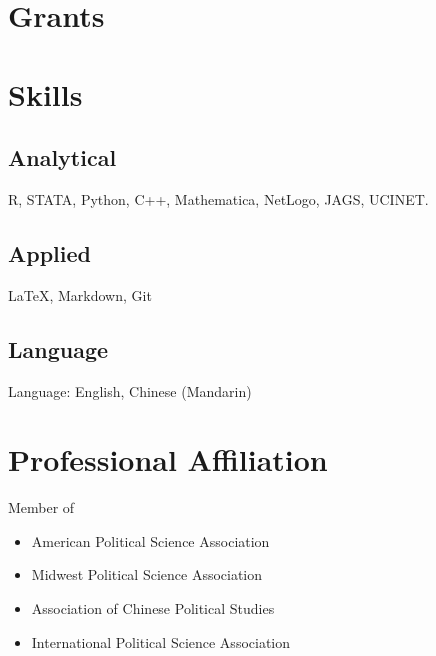 \documentclass[11pt,a4paper,]{awesome-cv}
\providecommand{\tightlist}{%
	\setlength{\itemsep}{0pt}\setlength{\parskip}{0pt}}
\begin{document}
\hypertarget{grants}{%
\section{Grants}\label{grants}}

\begin{cventries}
    \vspace{-4.0mm}
    \vspace{-4.0mm}
    \vspace{-4.0mm}
\end{cventries}

\hypertarget{skills}{%
\section{Skills}\label{skills}}

\hypertarget{analytical}{%
\subsection{Analytical}\label{analytical}}

R, STATA, Python, C++, Mathematica, NetLogo, JAGS, UCINET.

\hypertarget{applied}{%
\subsection{Applied}\label{applied}}

LaTeX, Markdown, Git

\hypertarget{language}{%
\subsection{Language}\label{language}}

Language: English, Chinese (Mandarin)

\hypertarget{professional-affiliation}{%
\section{Professional Affiliation}\label{professional-affiliation}}

Member of

\begin{itemize}
\tightlist
\item
  American Political Science Association
\item
  Midwest Political Science Association
\item
  Association of Chinese Political Studies
\item
  International Political Science Association
\end{itemize}
\end{document}
